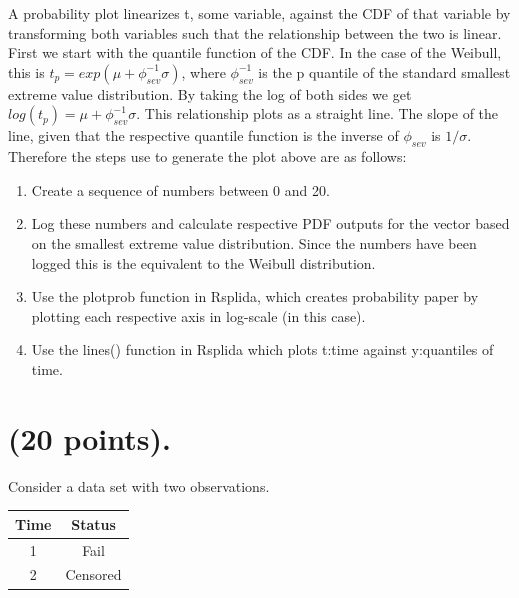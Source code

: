 \documentclass{article}
\begin{document}
A probability plot linearizes t, some variable, against the CDF of that variable by transforming both variables such that the relationship between the two is linear.  First we start with the quantile function of the CDF.  In the case of the Weibull, this is \(t_p = exp(\mu + \phi_{sev}^{-1} \sigma)\), where \(\phi_{sev}^{-1}\) is the p quantile of the standard smallest extreme value distribution.  By taking the log of both sides we get \(log(t_p) = \mu + \phi_{sev}^{-1} \sigma\).  This relationship plots as a straight line.  The slope of the line, given that the respective quantile function is the inverse of  \(\phi_{sev}\) is \(1/\sigma\).\\

Therefore the steps use to generate the plot above are as follows:\\
\begin{enumerate}
\item Create a sequence of numbers between 0 and 20.\\

\item Log these numbers and calculate respective PDF outputs for the vector based on the smallest extreme value distribution.  Since the numbers have been logged this is the equivalent to the Weibull distribution.

\item Use the plotprob function in Rsplida, which creates probability paper by plotting each respective axis in log-scale (in this case).

\item Use the lines() function in Rsplida which plots t:time against y:quantiles of time.
\end{enumerate}

\vspace{2cm}
\section{(20 points).}
Consider a data set with two observations.\\

\begin{center}
\begin{tabular}{c c}
\hline
Time & Status\\
\hline
1 & Fail\\
2 & Censored\\
\hline
\end{tabular}
\end{center}
\end{document}
